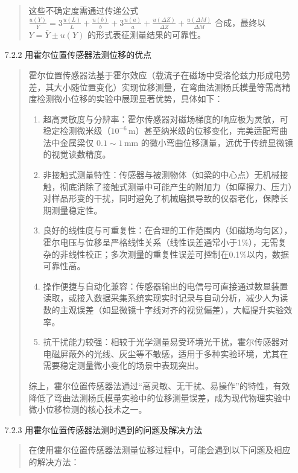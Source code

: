 \documentclass[11pt]{article}
\begin{document}
\begin{enumerate}
\begin{quote}
    这些不确定度需通过传递公式 \( \frac{u(Y)}{Y} = 3\frac{u(L)}{L} + \frac{u(b)}{b} + 3\frac{u(a)}{a} + \frac{u(\Delta Z)}{\Delta Z} + \frac{u(\Delta M)}{\Delta M} \) 合成，最终以 \( Y = \bar{Y} \pm u(Y) \) 的形式表征测量结果的可靠性。
    \end{quote}

    \item[7.2.2] 用霍尔位置传感器法测位移的优点
    \begin{quote}
    霍尔位置传感器法基于霍尔效应（载流子在磁场中受洛伦兹力形成电势差，其大小随位置变化）实现位移测量，在弯曲法测杨氏模量等需高精度检测微小位移的实验中展现显著优势，具体如下：

    \begin{enumerate}
        \item 超高灵敏度与分辨率：霍尔传感器对磁场梯度的响应极为灵敏，可稳定检测微米级（\( 10^{-6} \, \text{m} \)）甚至纳米级的位移变化，完美适配弯曲法中金属梁仅 \( 0.1 \sim 1 \, \text{mm} \) 的微小弯曲位移测量，远优于传统显微镜的视觉读数精度。
        \item 非接触式测量特性：传感器与被测物体（如梁的中心点）无机械接触，彻底消除了接触式测量中可能产生的附加力（如摩擦力、压力）对样品形变的干扰，同时避免了机械磨损导致的仪器老化，保障长期测量稳定性。
        \item 良好的线性度与可重复性：在合理的工作范围内（如磁场均匀区），霍尔电压与位移呈严格线性关系（线性误差通常小于1\%），无需复杂的非线性校正；多次测量的重复性误差可控制在0.1\%以内，数据可靠性高。
        \item 操作便捷与自动化兼容：传感器输出的电信号可直接通过数显装置读取，或接入数据采集系统实现实时记录与自动分析，减少人为读数的主观误差（如显微镜十字线对齐的视觉偏差），大幅提升实验效率。
        \item 抗干扰能力较强：相较于光学测量易受环境光干扰，霍尔传感器对电磁屏蔽外的光线、灰尘等不敏感，适用于多种实验环境，尤其在需要稳定测量微小变化的场景中表现突出。
    \end{enumerate}

    综上，霍尔位置传感器法通过“高灵敏、无干扰、易操作”的特性，有效降低了弯曲法测杨氏模量实验中的位移测量误差，成为现代物理实验中微小位移检测的核心技术之一。
    \end{quote}

    \item[7.2.3]用霍尔位置传感器法测时遇到的问题及解决方法
    \begin{quote}
    在使用霍尔位置传感器法测量位移过程中，可能会遇到以下问题及相应的解决方法：


\end{quote}
\end{enumerate}
\end{document}
